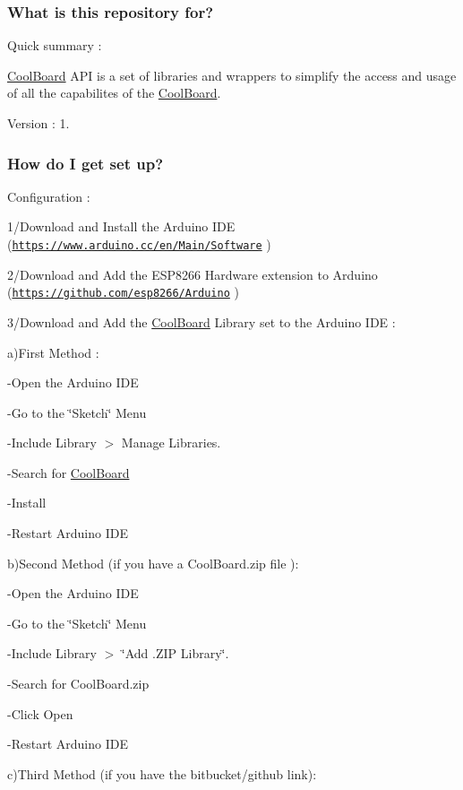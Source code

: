 \subsubsection*{What is this repository for?}

Quick summary \+:

\hyperlink{class_cool_board}{Cool\+Board} A\+PI is a set of libraries and wrappers to simplify the access and usage of all the capabilites of the \hyperlink{class_cool_board}{Cool\+Board}.

Version \+: 1.

\subsubsection*{How do I get set up?}

Configuration \+:

1/\+Download and Install the Arduino I\+DE (\href{https://www.arduino.cc/en/Main/Software}{\tt https\+://www.\+arduino.\+cc/en/\+Main/\+Software} )

2/\+Download and Add the E\+S\+P8266 Hardware extension to Arduino (\href{https://github.com/esp8266/Arduino}{\tt https\+://github.\+com/esp8266/\+Arduino} )

3/\+Download and Add the \hyperlink{class_cool_board}{Cool\+Board} Library set to the Arduino I\+DE \+:

a)First Method \+:

-\/\+Open the Arduino I\+DE

-\/\+Go to the \char`\"{}\+Sketch\char`\"{} Menu

-\/\+Include Library $>$ Manage Libraries.

-\/\+Search for \hyperlink{class_cool_board}{Cool\+Board}

-\/\+Install

-\/\+Restart Arduino I\+DE

b)Second Method (if you have a Cool\+Board.\+zip file )\+:

-\/\+Open the Arduino I\+DE

-\/\+Go to the \char`\"{}\+Sketch\char`\"{} Menu

-\/\+Include Library $>$ \char`\"{}\+Add .\+Z\+I\+P Library\char`\"{}.

-\/\+Search for Cool\+Board.\+zip

-\/\+Click Open

-\/\+Restart Arduino I\+DE

c)Third Method (if you have the bitbucket/github link)\+:


